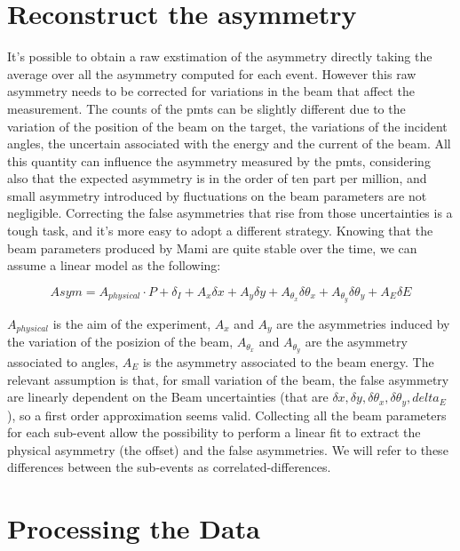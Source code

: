 \documentclass[10pt,a4paper]{article}
\begin{document}
\section{Reconstruct the asymmetry}

It's possible to obtain a raw exstimation of the asymmetry directly taking the average over all the asymmetry computed for each event. However this raw asymmetry needs to be corrected for variations in the beam that affect the measurement. The counts of the pmts can be slightly different due to the variation of the position of the beam on the target, the variations of the incident angles, the uncertain associated with the energy and the current of the beam. All this quantity can influence the asymmetry measured by the pmts, considering also that the expected asymmetry is in the order of ten part per million, and small asymmetry introduced by fluctuations on the beam parameters are not negligible. Correcting the false asymmetries that rise from those uncertainties is a tough task, and it's more easy to adopt a different strategy. Knowing that the beam parameters produced by Mami are quite stable over the time, we can assume a linear model as the following:

\begin{equation}
Asym = A_{physical} \cdot P + \delta_{I} + A_{x} \delta x + A_{y} \delta y + A_{\theta_{x}} \delta \theta_{x} + A_{\theta_{y}} \delta \theta_{y}+ A_{E} \delta E 
\end{equation}

$A_{physical}$ is the aim of the experiment, $A_{x}$ and $A_{y}$ are the asymmetries induced by the variation of the posizion of the beam, $A_{\theta_{x}}$ and $A_{\theta_{y}}$ are the asymmetry associated to angles, $A_{E}$ is the asymmetry associated to the beam energy. 
The relevant assumption is that, for small variation of the beam, the false asymmetry are linearly dependent on the Beam uncertainties (that are $\delta x, \delta y, \delta \theta_{x}, \delta \theta_{y}, delta_{E}$), so a first order approximation seems valid. Collecting all the beam parameters for each sub-event allow the possibility to perform a linear fit to extract the physical asymmetry (the offset) and the false asymmetries.  We will refer to these differences between the sub-events as correlated-differences. 

 

\section{Processing the Data}
\end{document}
